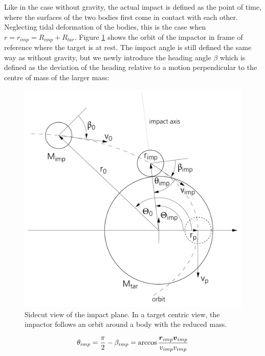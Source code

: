 Like in the case without gravity, the actual impact is defined as the point of time, where the surfaces of the two bodies first come in contact with each other. Neglecting tidal deformation of the bodies, this is the case when $r = r_{imp} = R_{imp} + R_{tar}$. Figure \ref{ch02_fig29} shows the orbit of the impactor in frame of reference where the target is at rest. The impact angle is still defined the same way as without gravity, but we newly introduce the heading angle $\beta$ which is defined as the deviation of the heading relative to a motion perpendicular to the centre of mass of the larger mass:
\begin{figure}[htbp]
\begin{center}
\includegraphics[scale=0.6]{29ssc.pdf}
\caption{Sidecut view of the impact plane. In a target centric view, the impactor follows an orbit around a body with the reduced mass.}
\label{ch02_fig29}
\end{center}
\end{figure}
\begin{align}
\label{ch02_aux_eq004}
\theta_{imp} = \frac{\pi}{2} - \beta_{imp} = \arccos{ \frac{\boldsymbol{r}_{imp} \boldsymbol{v}_{imp}}{v_{imp} v_{imp}} }
\end{align}

